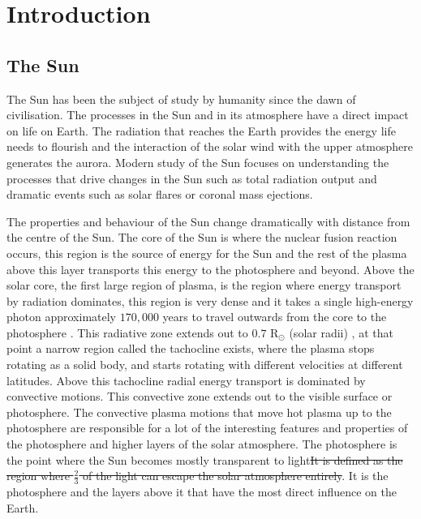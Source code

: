 \documentclass[a4paper,12pt,fourier,authoryear,custommargin]{Classes/PhDThesisPSnPDF}
\providecommand{\DIFdeltex}[1]{{\protect\color{red}\sout{#1}}}                      %
\providecommand{\DIFdelbegin}{} %
\providecommand{\DIFdelend}{} %
\providecommand{\DIFdel}[1]{\texorpdfstring{\DIFdeltex{#1}}{}} %
\begin{document}
\chapter{Introduction}  %


\section{The Sun} %
The Sun has been the subject of study by humanity since the dawn of civilisation.
The processes in the Sun and in its atmosphere have a direct impact on life on Earth.
The radiation that reaches the Earth provides the energy life needs to flourish and the interaction of the solar wind with the upper atmosphere generates the aurora.
Modern study of the Sun focuses on understanding the processes that drive changes in the Sun such as total radiation output and dramatic events such as solar flares or coronal mass ejections.

The properties and behaviour of the Sun change dramatically with distance from the centre of the Sun.
The core of the Sun is where the nuclear fusion reaction occurs, this region is the source of energy for the Sun and the rest of the plasma above this layer transports this energy to the photosphere and beyond.
Above the solar core, the first large region of plasma, is the region where energy transport by radiation dominates, this region is very dense and it takes a single high-energy photon approximately $170,000$ years to travel outwards from the core to the photosphere \citep{priest2014}.
This radiative zone extends out to $0.7$ R$_\odot$ (solar radii) \citep{priest2014}, at that point a narrow region called the tachocline exists, where the plasma stops rotating as a solid body, and starts rotating with different velocities at different latitudes.
Above this tachocline radial energy transport is dominated by convective motions.
This convective zone extends out to the visible surface or photosphere.
The convective plasma motions that move hot plasma up to the photosphere are responsible for a lot of the interesting features and properties of the photosphere and higher layers of the solar atmosphere.
The photosphere is the point where the Sun becomes mostly transparent to light\DIFdelbegin \DIFdel{It is defined as the region where $\frac{2}{3}$ of the light can escape the solar atmosphere entirely}\DIFdelend .
It is the photosphere and the layers above it that have the most direct influence on the Earth.
\end{document}
